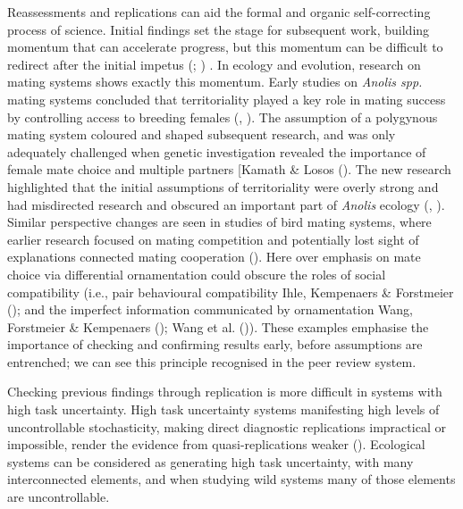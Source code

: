 \documentclass[10pt,a4paper]{article}
\begin{document}
Reassessments and replications can aid the formal and organic self-correcting process of science.
Initial findings set the stage for subsequent work, building momentum that can accelerate progress, but this momentum can be difficult to redirect after the initial impetus (; ) .
In ecology and evolution, research on mating systems shows exactly this momentum.
Early studies on \emph{Anolis spp.} mating systems concluded that territoriality played a key role in mating success by controlling access to breeding females (, ).
The assumption of a polygynous mating system coloured and shaped subsequent research, and was only adequately challenged when genetic investigation revealed the importance of female mate choice and multiple partners {[}Kamath \& Losos ().
The new research highlighted that the initial assumptions of territoriality were overly strong and had misdirected research and obscured an important part of \emph{Anolis} ecology (, ).
Similar perspective changes are seen in studies of bird mating systems, where earlier research focused on mating competition and potentially lost sight of explanations connected mating cooperation ().
Here over emphasis on mate choice via differential ornamentation could obscure the roles of social compatibility (i.e., pair behavioural compatibility Ihle, Kempenaers \& Forstmeier (); and the imperfect information communicated by ornamentation Wang, Forstmeier \& Kempenaers (); Wang et al. ()).
These examples emphasise the importance of checking and confirming results early, before assumptions are entrenched; we can see this principle recognised in the peer review system.

Checking previous findings through replication is more difficult in systems with high task uncertainty.
High task uncertainty systems manifesting high levels of uncontrollable stochasticity, making direct diagnostic replications impractical or impossible, render the evidence from quasi-replications weaker ().
Ecological systems can be considered as generating high task uncertainty, with many interconnected elements, and when studying wild systems many of those elements are uncontrollable.
\end{document}
